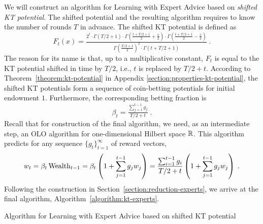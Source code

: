 We will construct an algorithm for Learning with Expert Advice based on
\emph{shifted KT potential}. The shifted potential and the resulting algorithm
requires to know the number of rounds $T$ in advance. The shifted KT
potential is defined as
$$
F_t(x) = \tfrac{2^t \cdot \Gamma\left(T/2 + 1 \right) \cdot \Gamma\left(\tfrac{t+T/2+1}{2} + \frac{x}{2} \right) \cdot \Gamma\left(\tfrac{t+T/2+1}{2} - \frac{x}{2} \right)}{\Gamma\left(\tfrac{T/2+1}{2} \right)^2 \cdot \Gamma \left(t+T/2+1\right)} \; .
$$
The reason for its name is that, up to a multiplicative constant, $F_t$ is equal
to the KT potential shifted in time by $T/2$, i.e., $t$ is replaced by $T/2+t$.
According to Theorem~\ref{theorem:kt-potential} in Appendix
\ref{section:properties-kt-potential}, the shifted KT potentials form
a sequence of coin-betting potentials for initial endowment $1$. Furthermore, the
corresponding betting fraction is
$$
\beta_t = \tfrac{\sum_{j=1}^{t-1} g_j}{T/2+t} \; .
$$
Recall that for construction of the final algorithm, we need, as an intermediate
step, an OLO algorithm for one-dimensional Hilbert space $\mathbb{R}$. This algorithm
predicts for any sequence $\{g_t\}_{t=1}^\infty$ of reward vectors,
$$
w_t
= \beta_t \operatorname{Wealth}_{t-1}
= \beta_t \left(1 + \sum_{j=1}^{t-1} g_j w_j \right)
= \frac{\sum_{i=1}^{t-1} g_i}{T/2+t} \left(1 + \sum_{j=1}^{t-1} g_j w_j \right) \; .
$$
Following the construction in Section~\ref{section:reduction-experts}, we arrive
at the final algorithm, Algorithm~\ref{algorithm:kt-experts}.

\begin{algorithm}[t]
\begin{algorithmic}
\caption{Algorithm for Learning with Expert Advice based on shifted KT potential
\label{algorithm:kt-experts}}
{
\ENDFOR
}
\end{algorithmic}
\end{algorithm}


